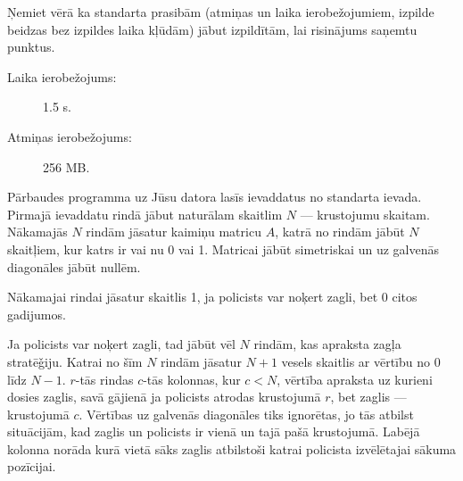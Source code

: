 \documentclass{boi2014-lv}
\begin{document}
	Ņemiet vērā ka standarta prasibām (atmiņas un laika ierobežojumiem, izpilde beidzas bez izpildes laika kļūdām) jābut izpildītām, lai risinājums saņemtu punktus. 

    \Constraints
    
    \begin{description}
        \item[Laika ierobežojums:] 1.5 s.
        \item[Atmiņas ierobežojums:] 256 MB.
    \end{description}

    \Experimentation
    
	Pārbaudes programma uz Jūsu datora lasīs ievaddatus no standarta ievada. Pirmajā ievaddatu rindā jābut naturālam skaitlim $N$ --- krustojumu skaitam. Nākamajās $N$ rindām jāsatur kaimiņu matricu $A$, katrā no rindām jābūt $N$ skaitļiem, kur katrs ir vai nu 0 vai 1. Matricai jābūt simetriskai un uz galvenās diagonāles jābūt nullēm. 

	Nākamajai rindai jāsatur skaitlis 1, ja policists var noķert zagli, bet 0 citos gadijumos.

	Ja policists var noķert zagli, tad jābūt vēl $N$ rindām, kas apraksta zagļa stratē\v{g}iju. Katrai no šīm $N$ rindām jāsatur $N+1$ vesels skaitlis ar vērtību no 0 līdz $N-1$. $r$-tās rindas $c$-tās kolonnas, kur $c < N$, vērtība apraksta uz kurieni dosies zaglis, savā gājienā ja policists atrodas krustojumā $r$, bet zaglis --- krustojumā $c$. Vērtības uz galvenās diagonāles tiks ignorētas, jo tās atbilst situācijām, kad zaglis un policists ir vienā un tajā pašā krustojumā. Labējā kolonna norāda kurā vietā sāks zaglis atbilstoši katrai policista izvēlētajai sākuma pozīcijai.
\end{document}
